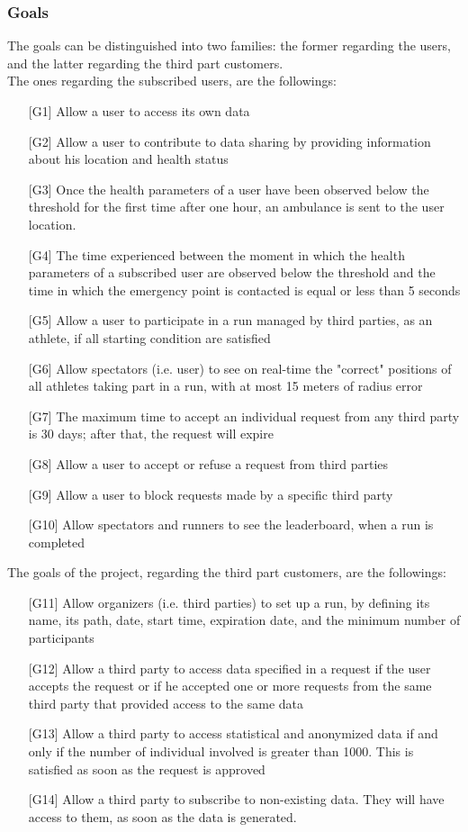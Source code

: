 \subsubsection{Goals}
The goals can be distinguished into two families: the former regarding the users, and the latter regarding the third part customers.\\
The ones regarding the subscribed users, are the followings:
\begin{enumerate}
\item[{[G1]}] Allow a user to access its own data
\item[{[G2]}] Allow a user to contribute to data sharing by providing information about his location and health status
\item[{[G3]}] Once the health parameters of a user have been observed 
below the threshold for the first time after one hour, an ambulance is sent to the user location. 
\item[{[G4]}] The time experienced between the moment in which the health parameters of a subscribed user are observed below the threshold and the time in which the emergency point is contacted is equal or less than 5 seconds
\item[{[G5]}] Allow a user to participate in a run managed by third parties, as an athlete, if all starting condition are satisfied
\item[{[G6]}] Allow spectators (i.e. user) to see on real-time the "correct" positions of all athletes taking part in a run, with at most 15 meters of radius error
\item[{[G7]}] The maximum time to accept an individual request from any third party is 30 days; after that, the request will expire
\item[{[G8]}] Allow a user to accept or refuse a request from third parties
\item[{[G9]}] Allow a user to block requests made by a specific third party
\item[{[G10]}] Allow spectators and runners to see the leaderboard, when a run is completed
\end{enumerate}
The goals of the project, regarding the third part customers, are the followings:
\begin{enumerate}
\item[{[G11]}] Allow organizers (i.e. third parties) to set up a run, by defining its name, its path, date, start time, expiration date, and the minimum number of participants
\item[{[G12]}] Allow a third party to access data specified in a request if the user accepts the request or if he accepted one or more requests from the same third party that provided access to the same data 
\item[{[G13]}] Allow a third party to access statistical and anonymized data if and only if the number of individual involved is greater than 1000. This is satisfied as soon as the request is approved  
\item[{[G14]}] Allow a third party to subscribe to non-existing data. They will have access to them, as soon as the data is generated. 
\end{enumerate}